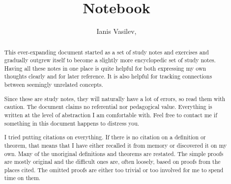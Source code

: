 \documentclass{scrartcl}
\title{Notebook}
\subtitle{\URL{https://github.com/v--/notebook}}
\author{Ianis Vasilev, \Email{ianis@ivasilev.net}}
\date{}
\begin{document}
\hfuzz=3.5pt
\maketitle

\begin{abstract}
  This ever-expanding document started as a set of study notes and exercises and gradually outgrew itself to become a slightly more encyclopedic set of study notes. Having all these notes in one place is quite helpful for both expressing my own thoughts clearly and for later reference. It is also helpful for tracking connections between seemingly unrelated concepts.

  Since these are study notes, they will naturally have a lot of errors, so read them with caution. The document claims no referential nor pedagogical value. Everything is written at the level of abstraction I am comfortable with. Feel free to contact me if something in this document happens to distress you.

  I tried putting citations on everything. If there is no citation on a definition or theorem, that means that I have either recalled it from memory or discovered it on my own. Many of the unoriginal definitions and theorems are restated. The simple proofs are mostly original and the difficult ones are, often loosely, based on proofs from the places cited. The omitted proofs are either too trivial or too involved for me to spend time on them.
\end{abstract}

\newpage
\tableofcontents
\newpage




























\end{document}
